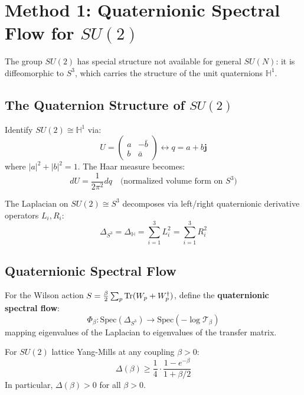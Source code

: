 \section{Method 1: Quaternionic Spectral Flow for \texorpdfstring{$SU(2)$}{SU(2)}}
\label{sec:quaternion}

The group $SU(2)$ has special structure not available for general $SU(N)$:
it is diffeomorphic to $S^3$, which carries the structure of the unit 
quaternions $\mathbb{H}^1$.

\subsection{The Quaternion Structure of \texorpdfstring{$SU(2)$}{SU(2)}}

\begin{definition}
Identify $SU(2) \cong \mathbb{H}^1$ via:
\[
U = \begin{pmatrix} a & -\bar{b} \\ b & \bar{a} \end{pmatrix} \longleftrightarrow q = a + b\mathbf{j}
\]
where $|a|^2 + |b|^2 = 1$. The Haar measure becomes:
\[
dU = \frac{1}{2\pi^2} dq \quad \text{(normalized volume form on } S^3\text{)}
\]
\end{definition}

\begin{definition}
The Laplacian on $SU(2) \cong S^3$ decomposes via left/right quaternionic 
derivative operators $L_i, R_i$:
\[
\Delta_{S^3} = \Delta_{\mathbb{H}} = \sum_{i=1}^{3} L_i^2 = \sum_{i=1}^{3} R_i^2
\]
\end{definition}

\subsection{Quaternionic Spectral Flow}

\begin{definition}
For the Wilson action $S = \frac{\beta}{2}\sum_p \operatorname{Tr}(W_p + W_p^\dagger)$, define the 
\textbf{quaternionic spectral flow}:
\[
\Phi_\beta : \text{Spec}(\Delta_{S^3}) \to \text{Spec}(-\log \mathcal{T}_\beta)
\]
mapping eigenvalues of the Laplacian to eigenvalues of the transfer matrix.
\end{definition}

\begin{theorem}
\label{thm:spectral-flow-su2}
For $SU(2)$ lattice Yang-Mills at any coupling $\beta > 0$:
\[
\Delta(\beta) \geq \frac{1}{4} \cdot \frac{1 - e^{-\beta}}{1 + \beta/2}
\]
In particular, $\Delta(\beta) > 0$ for all $\beta > 0$.
\end{theorem}

